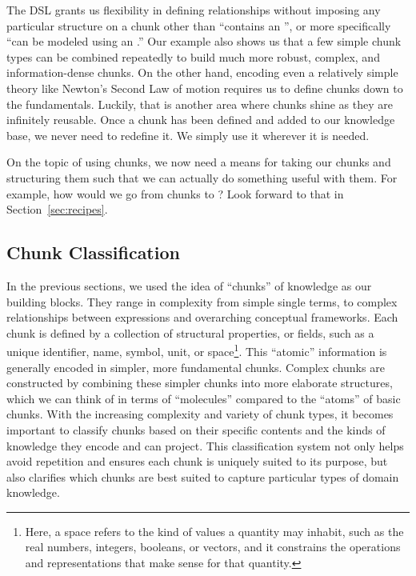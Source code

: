 The  DSL grants us flexibility in defining relationships without 
imposing any particular structure on a chunk other than ``contains an 
'', or more specifically ``can be modeled using an .''
Our example also shows us that a few simple chunk types can be combined 
repeatedly to build much more robust, complex, and information-dense chunks. On 
the other hand, encoding even a relatively simple theory like Newton's Second 
Law of motion requires us to define chunks down to the fundamentals. 
Luckily, that is another area where chunks shine as they are infinitely 
reusable. Once a chunk has been defined and added to our knowledge base, we
never need to redefine it. We simply use it wherever it is needed.

On the topic of using chunks, we now need a means for taking our chunks and 
structuring them such that we can actually do something useful with them. For 
example, how would we go from chunks to \sfs{}? Look forward to that in 
Section~\ref{sec:recipes}.

\subsection{Chunk Classification}

In the previous sections, we used the idea of ``chunks'' of knowledge as our
building blocks. They range in complexity from simple single terms, to complex 
relationships between expressions and overarching conceptual frameworks. Each 
chunk is defined by a collection of structural properties, or fields, such as a 
unique identifier, name, symbol, unit, or space\footnote{Here, a space refers 
to the kind of values a quantity may inhabit, such as the real numbers, 
integers, booleans, or vectors, and it constrains the operations and 
representations that make sense for that quantity.}.
This ``atomic'' information is generally encoded in simpler, more fundamental 
chunks. Complex chunks are 
constructed by combining these simpler chunks into more elaborate structures, 
which we can think of in terms of ``molecules'' compared to the ``atoms'' of
basic chunks. With the increasing complexity and variety of chunk types, it 
becomes important to classify chunks based on their specific contents and the 
kinds of knowledge they encode and can project. This classification system not 
only helps avoid repetition and ensures each chunk is uniquely suited to its 
purpose, but also clarifies which chunks are best suited to capture particular 
types of domain knowledge.

